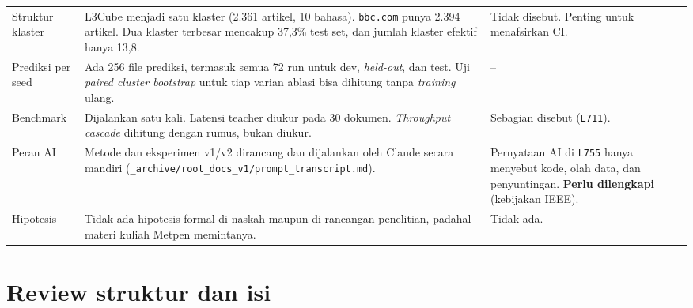 \documentclass[10pt,a4paper]{article}
\newcommand{\old}[1]{\texttt{L#1}}
\begin{document}
\begin{longtable}{@{}p{}p{}p{}@{}}
Struktur klaster & L3Cube menjadi satu klaster (2.361 artikel, 10 bahasa). \texttt{bbc.com} punya 2.394 artikel. Dua klaster terbesar mencakup 37,3\% test set, dan jumlah klaster efektif hanya 13,8. & Tidak disebut. Penting untuk menafsirkan CI.\\
Prediksi per seed & Ada 256 file prediksi, termasuk semua 72 run untuk dev, \emph{held-out}, dan test. Uji \emph{paired cluster bootstrap} untuk tiap varian ablasi bisa dihitung tanpa \emph{training} ulang. & --\\
Benchmark & Dijalankan satu kali. Latensi teacher diukur pada 30 dokumen. \emph{Throughput cascade} dihitung dengan rumus, bukan diukur. & Sebagian disebut (\old{711}).\\
Peran AI & Metode dan eksperimen v1/v2 dirancang dan dijalankan oleh Claude secara mandiri (\texttt{\_archive/root\_docs\_v1/prompt\_transcript.md}). & Pernyataan AI di \old{755} hanya menyebut kode, olah data, dan penyuntingan. \textbf{Perlu dilengkapi} (kebijakan IEEE).\\
Hipotesis & Tidak ada hipotesis formal di naskah maupun di rancangan penelitian, padahal materi kuliah Metpen memintanya. & Tidak ada.\\
\bottomrule
\end{longtable}

\section{Review struktur dan isi}
\end{document}
